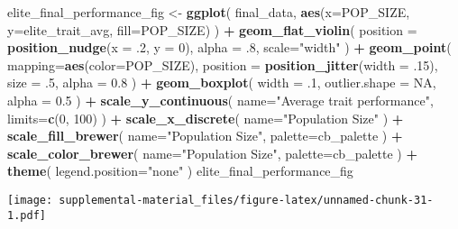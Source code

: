 \documentclass[]{book}
\newenvironment{Shaded}{\begin{snugshade}}{\end{snugshade}}
\newcommand{\DataTypeTok}[1]{\textcolor[rgb]{0.13,0.29,0.53}{#1}}
\newcommand{\DecValTok}[1]{\textcolor[rgb]{0.00,0.00,0.81}{#1}}
\newcommand{\FloatTok}[1]{\textcolor[rgb]{0.00,0.00,0.81}{#1}}
\newcommand{\KeywordTok}[1]{\textcolor[rgb]{0.13,0.29,0.53}{\textbf{#1}}}
\newcommand{\NormalTok}[1]{#1}
\newcommand{\OperatorTok}[1]{\textcolor[rgb]{0.81,0.36,0.00}{\textbf{#1}}}
\newcommand{\OtherTok}[1]{\textcolor[rgb]{0.56,0.35,0.01}{#1}}
\newcommand{\StringTok}[1]{\textcolor[rgb]{0.31,0.60,0.02}{#1}}
\begin{document}
\begin{Shaded}
\begin{Highlighting}[]
\NormalTok{elite_final_performance_fig <-}\StringTok{ }\KeywordTok{ggplot}\NormalTok{(}
\NormalTok{    final_data,}
    \KeywordTok{aes}\NormalTok{(}\DataTypeTok{x=}\NormalTok{POP_SIZE, }\DataTypeTok{y=}\NormalTok{elite_trait_avg, }\DataTypeTok{fill=}\NormalTok{POP_SIZE)}
\NormalTok{  ) }\OperatorTok{+}
\StringTok{  }\KeywordTok{geom_flat_violin}\NormalTok{(}
    \DataTypeTok{position =} \KeywordTok{position_nudge}\NormalTok{(}\DataTypeTok{x =} \FloatTok{.2}\NormalTok{, }\DataTypeTok{y =} \DecValTok{0}\NormalTok{),}
    \DataTypeTok{alpha =} \FloatTok{.8}\NormalTok{,}
    \DataTypeTok{scale=}\StringTok{"width"}
\NormalTok{  ) }\OperatorTok{+}
\StringTok{  }\KeywordTok{geom_point}\NormalTok{(}
    \DataTypeTok{mapping=}\KeywordTok{aes}\NormalTok{(}\DataTypeTok{color=}\NormalTok{POP_SIZE),}
    \DataTypeTok{position =} \KeywordTok{position_jitter}\NormalTok{(}\DataTypeTok{width =} \FloatTok{.15}\NormalTok{),}
    \DataTypeTok{size =} \FloatTok{.5}\NormalTok{,}
    \DataTypeTok{alpha =} \FloatTok{0.8}
\NormalTok{  ) }\OperatorTok{+}
\StringTok{  }\KeywordTok{geom_boxplot}\NormalTok{(}
    \DataTypeTok{width =} \FloatTok{.1}\NormalTok{,}
    \DataTypeTok{outlier.shape =} \OtherTok{NA}\NormalTok{,}
    \DataTypeTok{alpha =} \FloatTok{0.5}
\NormalTok{  ) }\OperatorTok{+}
\StringTok{  }\KeywordTok{scale_y_continuous}\NormalTok{(}
    \DataTypeTok{name=}\StringTok{"Average trait performance"}\NormalTok{,}
    \DataTypeTok{limits=}\KeywordTok{c}\NormalTok{(}\DecValTok{0}\NormalTok{, }\DecValTok{100}\NormalTok{)}
\NormalTok{  ) }\OperatorTok{+}
\StringTok{  }\KeywordTok{scale_x_discrete}\NormalTok{(}
    \DataTypeTok{name=}\StringTok{"Population Size"}
\NormalTok{  ) }\OperatorTok{+}
\StringTok{  }\KeywordTok{scale_fill_brewer}\NormalTok{(}
    \DataTypeTok{name=}\StringTok{"Population Size"}\NormalTok{,}
    \DataTypeTok{palette=}\NormalTok{cb_palette}
\NormalTok{  ) }\OperatorTok{+}
\StringTok{  }\KeywordTok{scale_color_brewer}\NormalTok{(}
    \DataTypeTok{name=}\StringTok{"Population Size"}\NormalTok{,}
    \DataTypeTok{palette=}\NormalTok{cb_palette}
\NormalTok{  ) }\OperatorTok{+}
\StringTok{  }\KeywordTok{theme}\NormalTok{(}
    \DataTypeTok{legend.position=}\StringTok{"none"}
\NormalTok{  )}
\NormalTok{elite_final_performance_fig}
\end{Highlighting}
\end{Shaded}

\texttt{[image: supplemental-material\_files/figure-latex/unnamed-chunk-31-1.pdf]}
\end{document}
